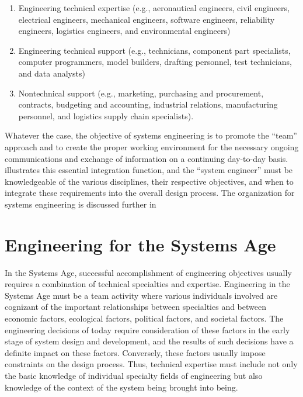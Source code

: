 \begin{enumerate}
\item Engineering technical expertise (e.g., aeronautical engineers, civil engineers, electrical engineers, mechanical engineers, software engineers, reliability engineers, logistics engineers, and environmental engineers)
\item Engineering technical support (e.g., technicians, component part specialists, computer programmers, model builders, drafting personnel, test technicians, and data analysts)
\item Nontechnical support (e.g., marketing, purchasing and procurement, contracts, budgeting and accounting, industrial relations, manufacturing personnel, and logistics supply chain specialists). 
\end{enumerate}

Whatever the case, the objective of systems engineering is to promote the “team” approach and to create the proper working environment for the necessary ongoing communications and exchange of information on a continuing day-to-day basis. illustrates this essential integration function, and the “system engineer” must be knowledgeable of the various disciplines, their respective objectives, and when to integrate these requirements into the overall design process. The organization for systems engineering is discussed further in


\section{Engineering for the Systems Age}

In the Systems Age, successful accomplishment of engineering objectives usually requires a combination of technical specialties and expertise. Engineering in the Systems Age must be a team activity where various individuals involved are cognizant of the important relationships between specialties and between economic factors, ecological factors, political factors, and societal factors. The engineering decisions of today require consideration of these factors in the early stage of system design and development, and the results of such decisions have a definite impact on these factors. Conversely, these factors usually impose constraints on the design process. Thus, technical expertise must include not only the basic knowledge of individual specialty fields of engineering but also knowledge of the context of the system being brought into being.

